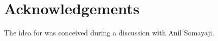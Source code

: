 \section{Acknowledgements}

The idea for \bpfcontain{} was conceived during a discussion with Anil Somayaji.

